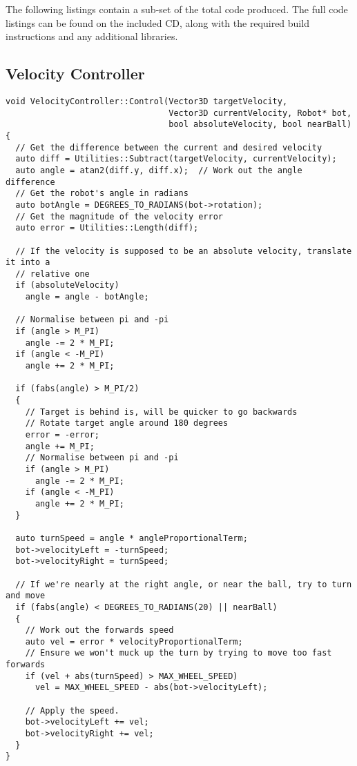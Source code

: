 The following listings contain a sub-set of the total code produced.  The full
code listings can be found on the included CD, along with the required build
instructions and any additional libraries.

\lstset{language=C++}

\subsection{Velocity Controller\label{app:velControl}}

\begin{lstlisting}
void VelocityController::Control(Vector3D targetVelocity, 
                                 Vector3D currentVelocity, Robot* bot, 
                                 bool absoluteVelocity, bool nearBall)
{
  // Get the difference between the current and desired velocity
  auto diff = Utilities::Subtract(targetVelocity, currentVelocity); 
  auto angle = atan2(diff.y, diff.x);  // Work out the angle difference
  // Get the robot's angle in radians
  auto botAngle = DEGREES_TO_RADIANS(bot->rotation);
  // Get the magnitude of the velocity error 
  auto error = Utilities::Length(diff); 

  // If the velocity is supposed to be an absolute velocity, translate it into a
  // relative one
  if (absoluteVelocity) 
    angle = angle - botAngle;

  // Normalise between pi and -pi
  if (angle > M_PI)
    angle -= 2 * M_PI;
  if (angle < -M_PI)
    angle += 2 * M_PI;

  if (fabs(angle) > M_PI/2) 
  {
    // Target is behind is, will be quicker to go backwards
    // Rotate target angle around 180 degrees
    error = -error;
    angle += M_PI;
    // Normalise between pi and -pi
    if (angle > M_PI)
      angle -= 2 * M_PI;
    if (angle < -M_PI)
      angle += 2 * M_PI;
  }

  auto turnSpeed = angle * angleProportionalTerm;
  bot->velocityLeft = -turnSpeed;
  bot->velocityRight = turnSpeed;

  // If we're nearly at the right angle, or near the ball, try to turn and move
  if (fabs(angle) < DEGREES_TO_RADIANS(20) || nearBall) 
  {
    // Work out the forwards speed
    auto vel = error * velocityProportionalTerm;
    // Ensure we won't muck up the turn by trying to move too fast forwards
    if (vel + abs(turnSpeed) > MAX_WHEEL_SPEED)
      vel = MAX_WHEEL_SPEED - abs(bot->velocityLeft);

    // Apply the speed.
    bot->velocityLeft += vel;
    bot->velocityRight += vel;
  }
}
\end{lstlisting}

